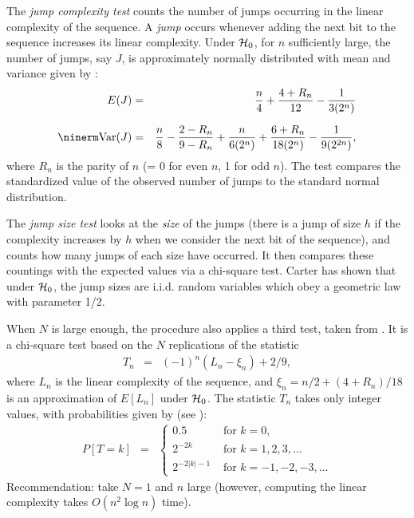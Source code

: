   The {\em jump complexity test\/} counts the number of jumps occurring in the
  linear complexity of the sequence.  A {\em jump\/} occurs whenever adding
  the next bit to the sequence increases its linear complexity.
  Under $\mathcal{H}_0$, for $n$ sufficiently large, the number of jumps, say $J$,
  is approximately normally distributed  with mean and variance
  given by \cite{rWAN97a}:
  \begin{eqnarray}
      E(J) & = & \frac n 4 + \frac{4 + R_n}{12} - \frac 1 {3(2^n)} \\[6pt]
   \Var(J) & = & \frac n 8 - \frac{2 - R_n}{9 - R_n} + \frac n {6(2^n)}
                 + \frac{6 + R_n}{18(2^n)} - \frac 1 {9(2^{2n})},
   \end{eqnarray}
  where $R_n$ is the parity of $n$ (= 0 for even $n$, 1 for odd $n$).
  The test compares the standardized value of the observed number
  of jumps to the standard normal distribution.

  The {\em jump size test\/} looks at the
  {\em size\/} of the jumps (there is a jump of size $h$ if the
  complexity increases by $h$ when we consider the next bit of the
  sequence), and counts how many jumps of each size have occurred.
  It then compares these countings with the expected values via a chi-square test.
   Carter has shown \cite{rCAR89a} that under $\mathcal{H}_0$, the jump sizes are i.i.d.
   random variables which obey a geometric law with parameter 1/2.

  When $N$ is large enough, the procedure also applies a third test,
  taken from \cite{rRUK01a}.  It is a chi-square
  test based on the $N$ replications of the statistic
  \begin{eqnarray}
   T_n  & = & (-1)^n (L_n - \xi_n) + 2/9,  \nonumber
  \end{eqnarray}
  where $L_n$ is the linear complexity of the sequence, and
  $\xi_n = n/2 + (4 + R_n)/18$ is an approximation of $E[L_n]$ under $\mathcal{H}_0$.
  The statistic $T_n$ takes only integer values, with probabilities
  given by (see \cite{rRUK01a}):
   \begin{eqnarray*}
     P[T = k] & = & \left\{\begin{array}{ll}
          0.5 & \mbox{ for } k=0, \\[4pt]
         \displaystyle {2^{-2k}} & \mbox{ for } k = 1, 2, 3,
    \ldots \\[4pt]
         \displaystyle { 2^{-2|k| - 1}} & \mbox{ for } k = -1, -2,
  -3, \ldots
       \end{array} \right.
   \end{eqnarray*}
  Recommendation: take $N=1$ and $n$ large (however, computing the
  linear complexity takes $O(n^2 \log n)$ time).
\endtab
\code


